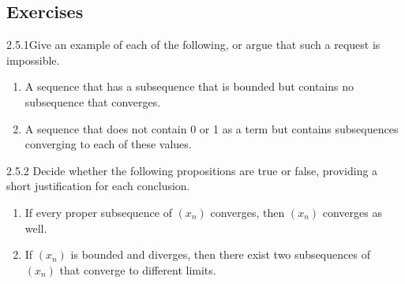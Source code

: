\renewcommand{\theenumi}{\alph{enumi}}
\renewcommand{\labelenumi}{(\theenumi)}
\subsection{Exercises}

\begin{exercise}
    {2.5.1}Give an example of each of the following, or argue that such a request is impossible.
    \begin{enumerate}
        \item A sequence that has a subsequence that is bounded but contains no subsequence that converges.
        \item A sequence that does not contain 0 or 1 as a term but contains subsequences converging to each of these values.
    \end{enumerate}
\end{exercise}


\begin{exercise}
    {2.5.2} Decide whether the following propositions are true or false, providing a short justification for each conclusion.
    \begin{enumerate}
        \item If every proper subsequence of \((x_n)\) converges, then \((x_n)\) converges as well.
              \setcounter{enumi}{2}
        \item If \((x_n)\) is bounded and diverges, then there exist two subsequences of \((x_n)\) that converge to different limits.
    \end{enumerate}
\end{exercise}


